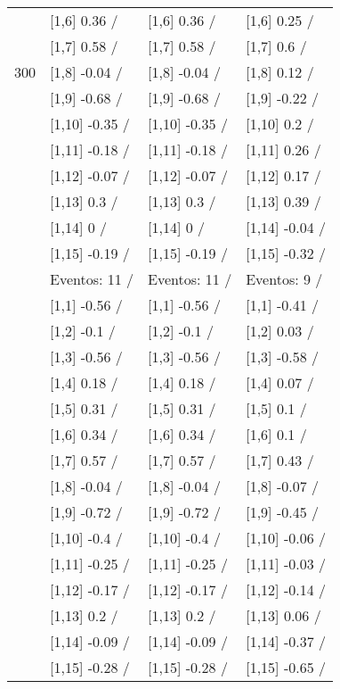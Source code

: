 \begin{table}
\begin{tabular}[t]{llll}
 & {}[1,6] 0.36  / & {}[1,6] 0.36  / & {}[1,6] 0.25  /\\
 & {}[1,7] 0.58  / & {}[1,7] 0.58  / & {}[1,7] 0.6  /\\
300 & {}[1,8] -0.04  / & {}[1,8] -0.04  / & {}[1,8] 0.12  /\\
\addlinespace
 & {}[1,9] -0.68  / & {}[1,9] -0.68  / & {}[1,9] -0.22  /\\
 & {}[1,10] -0.35  / & {}[1,10] -0.35  / & {}[1,10] 0.2  /\\
 & {}[1,11] -0.18  / & {}[1,11] -0.18  / & {}[1,11] 0.26  /\\
 & {}[1,12] -0.07  / & {}[1,12] -0.07  / & {}[1,12] 0.17  /\\
 & {}[1,13] 0.3  / & {}[1,13] 0.3  / & {}[1,13] 0.39  /\\
\addlinespace
 & {}[1,14] 0  / & {}[1,14] 0  / & {}[1,14] -0.04  /\\
 & {}[1,15] -0.19  / & {}[1,15] -0.19  / & {}[1,15] -0.32  /\\
 & Eventos:  11 / & Eventos:  11 / & Eventos:  9 /\\
 & {}[1,1] -0.56  / & {}[1,1] -0.56  / & {}[1,1] -0.41  /\\
 & {}[1,2] -0.1  / & {}[1,2] -0.1  / & {}[1,2] 0.03  /\\
\addlinespace
 & {}[1,3] -0.56  / & {}[1,3] -0.56  / & {}[1,3] -0.58  /\\
 & {}[1,4] 0.18  / & {}[1,4] 0.18  / & {}[1,4] 0.07  /\\
 & {}[1,5] 0.31  / & {}[1,5] 0.31  / & {}[1,5] 0.1  /\\
 & {}[1,6] 0.34  / & {}[1,6] 0.34  / & {}[1,6] 0.1  /\\
 & {}[1,7] 0.57  / & {}[1,7] 0.57  / & {}[1,7] 0.43  /\\
\addlinespace
500 & {}[1,8] -0.04  / & {}[1,8] -0.04  / & {}[1,8] -0.07  /\\
 & {}[1,9] -0.72  / & {}[1,9] -0.72  / & {}[1,9] -0.45  /\\
 & {}[1,10] -0.4  / & {}[1,10] -0.4  / & {}[1,10] -0.06  /\\
 & {}[1,11] -0.25  / & {}[1,11] -0.25  / & {}[1,11] -0.03  /\\
 & {}[1,12] -0.17  / & {}[1,12] -0.17  / & {}[1,12] -0.14  /\\
\addlinespace
 & {}[1,13] 0.2  / & {}[1,13] 0.2  / & {}[1,13] 0.06  /\\
 & {}[1,14] -0.09  / & {}[1,14] -0.09  / & {}[1,14] -0.37  /\\
 & {}[1,15] -0.28  / & {}[1,15] -0.28  / & {}[1,15] -0.65  /\\
\bottomrule
\end{tabular}
\end{table}
